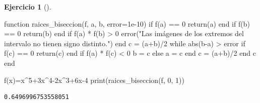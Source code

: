 \documentclass[
  a4paper,
]{scrreport}
\newenvironment{Shaded}{\begin{snugshade}}{\end{snugshade}}
\newcommand{\ControlFlowTok}[1]{\textcolor[rgb]{0.00,0.23,0.31}{#1}}
\newcommand{\FloatTok}[1]{\textcolor[rgb]{0.68,0.00,0.00}{#1}}
\newcommand{\FunctionTok}[1]{\textcolor[rgb]{0.28,0.35,0.67}{#1}}
\newcommand{\KeywordTok}[1]{\textcolor[rgb]{0.00,0.23,0.31}{#1}}
\newcommand{\NormalTok}[1]{\textcolor[rgb]{0.00,0.23,0.31}{#1}}
\newcommand{\OperatorTok}[1]{\textcolor[rgb]{0.37,0.37,0.37}{#1}}
\newcommand{\StringTok}[1]{\textcolor[rgb]{0.13,0.47,0.30}{#1}}
\theoremstyle{definition}
\newtheorem{exercise}{Ejercicio}[chapter]
\theoremstyle{remark}
\begin{document}
\begin{exercise}[]
\begin{tcolorbox}
\begin{Shaded}
\begin{Highlighting}[]
\KeywordTok{function} \FunctionTok{raices\_biseccion}\NormalTok{(f, a, b, error}\OperatorTok{=}\FloatTok{1e{-}10}\NormalTok{)}
  \ControlFlowTok{if} \FunctionTok{f}\NormalTok{(a) }\OperatorTok{==} \FloatTok{0} \ControlFlowTok{return}\NormalTok{(a) }\ControlFlowTok{end}
  \ControlFlowTok{if} \FunctionTok{f}\NormalTok{(b) }\OperatorTok{==} \FloatTok{0} \ControlFlowTok{return}\NormalTok{(b) }\ControlFlowTok{end}
  \ControlFlowTok{if} \FunctionTok{f}\NormalTok{(a) }\OperatorTok{*} \FunctionTok{f}\NormalTok{(b) }\OperatorTok{\textgreater{}} \FloatTok{0} \FunctionTok{error}\NormalTok{(}\StringTok{"Las imágenes de los extremos del intervalo no tienen signo distinto."}\NormalTok{) }\ControlFlowTok{end}
\NormalTok{  c }\OperatorTok{=}\NormalTok{ (a}\OperatorTok{+}\NormalTok{b)}\OperatorTok{/}\FloatTok{2}
  \ControlFlowTok{while} \FunctionTok{abs}\NormalTok{(b}\OperatorTok{{-}}\NormalTok{a) }\OperatorTok{\textgreater{}}\NormalTok{ error}
    \ControlFlowTok{if} \FunctionTok{f}\NormalTok{(c) }\OperatorTok{==} \FloatTok{0} \ControlFlowTok{return}\NormalTok{(c) }\ControlFlowTok{end}
    \ControlFlowTok{if} \FunctionTok{f}\NormalTok{(a) }\OperatorTok{*} \FunctionTok{f}\NormalTok{(c) }\OperatorTok{\textless{}} \FloatTok{0}
\NormalTok{       b }\OperatorTok{=}\NormalTok{ c}
    \ControlFlowTok{else}
\NormalTok{       a }\OperatorTok{=}\NormalTok{ c}
    \ControlFlowTok{end}
\NormalTok{    c }\OperatorTok{=}\NormalTok{ (a}\OperatorTok{+}\NormalTok{b)}\OperatorTok{/}\FloatTok{2}
  \ControlFlowTok{end}
\NormalTok{  c}
\KeywordTok{end}

\FunctionTok{f}\NormalTok{(x)}\OperatorTok{=}\NormalTok{x}\OperatorTok{\^{}}\FloatTok{5}\OperatorTok{+}\FloatTok{3}\NormalTok{x}\OperatorTok{\^{}}\FloatTok{4}\OperatorTok{{-}}\FloatTok{2}\NormalTok{x}\OperatorTok{\^{}}\FloatTok{3}\OperatorTok{+}\FloatTok{6}\NormalTok{x}\OperatorTok{{-}}\FloatTok{4}
\FunctionTok{print}\NormalTok{(}\FunctionTok{raices\_biseccion}\NormalTok{(f, }\FloatTok{0}\NormalTok{, }\FloatTok{1}\NormalTok{))}
\end{Highlighting}
\end{Shaded}

\begin{verbatim}
0.6496996753558051
\end{verbatim}

\end{tcolorbox}

\end{exercise}
\end{document}

